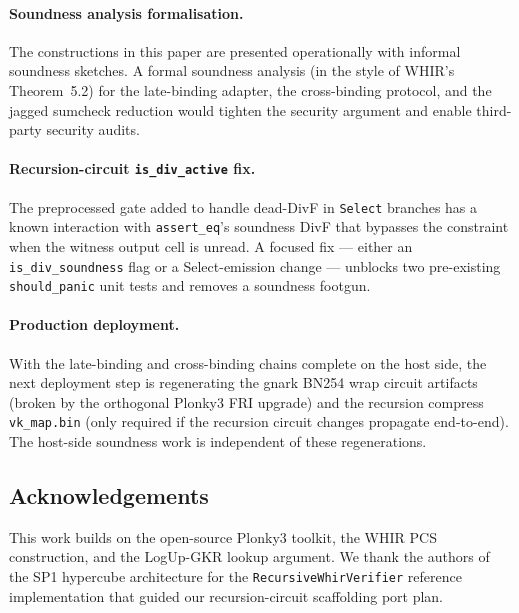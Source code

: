 \paragraph{Soundness analysis formalisation.}  The constructions
in this paper are presented operationally with informal soundness
sketches.  A formal soundness analysis (in the style of WHIR's
Theorem~5.2) for the late-binding adapter, the cross-binding
protocol, and the jagged sumcheck reduction would tighten the
security argument and enable third-party security audits.

\paragraph{Recursion-circuit \texttt{is\_div\_active} fix.}  The
preprocessed gate added to handle dead-DivF in \texttt{Select}
branches has a known interaction with \texttt{assert\_eq}'s
soundness DivF that bypasses the constraint when the witness
output cell is unread.  A focused fix --- either an
\texttt{is\_div\_soundness} flag or a Select-emission change ---
unblocks two pre-existing \texttt{should\_panic} unit tests and
removes a soundness footgun.

\paragraph{Production deployment.}  With the late-binding and
cross-binding chains complete on the host side, the next
deployment step is regenerating the gnark BN254 wrap circuit
artifacts (broken by the orthogonal Plonky3 FRI upgrade) and the
recursion compress \texttt{vk\_map.bin} (only required if the
recursion circuit changes propagate end-to-end).  The host-side
soundness work is independent of these regenerations.

\subsection{Acknowledgements}

This work builds on the open-source Plonky3 toolkit, the WHIR PCS
construction, and the LogUp-GKR lookup argument.  We thank the
authors of the SP1 hypercube architecture for the
\texttt{RecursiveWhirVerifier} reference implementation that
guided our recursion-circuit scaffolding port plan.
